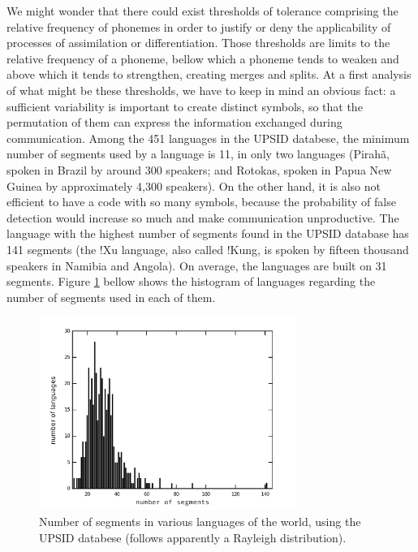 We might wonder that there could exist thresholds of tolerance comprising the relative frequency of phonemes in order to justify or deny the applicability of processes of assimilation or differentiation. Those thresholds are limits to the relative frequency of a phoneme, bellow which a phoneme tends to weaken and above which it tends to strengthen, creating merges and splits. At a first analysis of what might be these thresholds, we have to keep in mind an obvious fact: a sufficient variability is important to create distinct symbols, so that the permutation of them can express the information exchanged during communication. Among the 451 languages in the UPSID databese, the minimum number of segments used by a language is 11, in only two languages (Pirah\~a, spoken in Brazil by around 300 speakers; and Rotokas, spoken in Papua New Guinea by approximately 4,300 speakers). On the other hand, it is also not efficient to have a code with so many symbols, because the probability of false detection would increase so much and make communication unproductive. The language with the highest number of segments found in the UPSID database has 141 segments (the !Xu language, also called !Kung, is spoken by fifteen thousand speakers in Namibia and Angola). On average, the languages are built on 
31 %
segments. Figure \ref{fig:language_segments_hist} bellow shows the histogram of languages regarding the number of segments used in each of them.

\begin{figure}[h!]
\centering
\includegraphics[width=0.75\textwidth]{images/segments_hist_upsid2.pdf}
\caption{Number of segments in various languages of the world, using the UPSID databese (follows apparently a Rayleigh distribution).}
\label{fig:language_segments_hist}
\end{figure}

